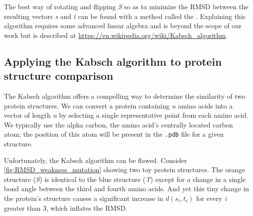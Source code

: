 The best way of rotating and flipping \textit{S} so as to minimize the RMSD between the resulting vectors \textit{s} and \textit{t} can be found with a method called the . Explaining this algorithm requires some advanced linear algebra and is beyond the scope of our work but is described at \url{https://en.wikipedia.org/wiki/Kabsch_algorithm}.

\FloatBarrier
{}
\subsection{Applying the Kabsch algorithm to protein structure comparison}

The Kabsch algorithm offers a compelling way to determine the similarity of two protein structures. We can convert a protein containing \textit{n} amino acids into a vector of length \textit{n} by selecting a single representative point from each amino acid. We typically use the alpha carbon, the amino acid's centrally located carbon atom; the position of this atom will be present in the \texttt{.pdb} file for a given structure.\\

\begin{qbox}\end{qbox}

Unfortunately, the Kabsch algorithm can be flawed. Consider \autoref{fig:RMSD_weakness_mutation} showing two toy protein structures. The orange structure (\textit{S}) is identical to the blue structure (\textit{T}) except for a change in a single bond angle between the third and fourth amino acids. And yet this tiny change in the protein's structure causes a significant increase in $d(s_{i}, t_{i})$ for every \textit{i} greater than 3, which inflates the RMSD.

